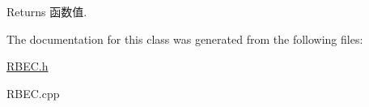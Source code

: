 \begin{DoxyReturn}{\-Returns}
函数值. 
\end{DoxyReturn}


\-The documentation for this class was generated from the following files\-:\begin{DoxyCompactItemize}
\item 
\hyperlink{RBEC_8h}{\-R\-B\-E\-C.\-h}\item 
\-R\-B\-E\-C.\-cpp\end{DoxyCompactItemize}

